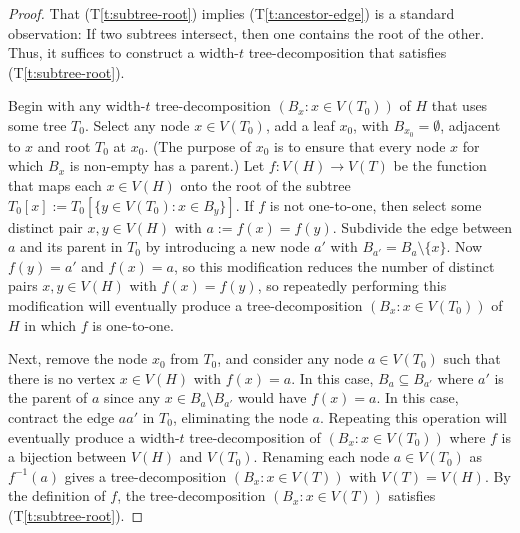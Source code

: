 \documentclass{patmorin}
\newcommand{\tref}[1]{(T\ref{t:#1})}
\begin{document}
\begin{proof}
  That \tref{subtree-root} implies \tref{ancestor-edge} is a standard observation: If two subtrees intersect, then one contains the root of the other.  Thus, it suffices to construct a width-$t$ tree-decomposition that satisfies \tref{subtree-root}.

  Begin with any width-$t$ tree-decomposition $(B_x:x\in V(T_0))$ of $H$ that uses some tree $T_0$.  Select any node $x\in V(T_0)$, add a leaf $x_0$, with $B_{x_0}=\emptyset$, adjacent to $x$ and root $T_0$ at $x_0$. (The purpose of $x_0$ is to ensure that every node $x$ for which $B_x$ is non-empty has a parent.)  Let $f:V(H)\to V(T)$ be the function that maps each $x\in V(H)$ onto the root of the subtree $T_0[x]:=T_0[\{y\in V(T_0): x\in B_y\}]$.  If $f$ is not one-to-one, then select some distinct pair $x,y\in V(H)$ with $a:=f(x)=f(y)$.  Subdivide the edge between $a$ and its parent in $T_0$ by introducing a new node $a'$ with $B_{a'}=B_{a}\setminus\{x\}$. Now $f(y)=a'$ and $f(x)=a$, so this modification reduces the number of distinct pairs $x,y\in V(H)$ with $f(x)=f(y)$, so repeatedly performing this modification will eventually produce a tree-decomposition $(B_x:x\in V(T_0))$ of $H$ in which $f$ is one-to-one.

  Next, remove the node $x_0$ from $T_0$, and consider any node $a\in V(T_0)$ such that there is no vertex $x\in V(H)$ with $f(x)=a$.  In this case, $B_{a}\subseteq B_{a'}$ where $a'$ is the parent of $a$ since any $x\in B_a\setminus B_{a'}$ would have $f(x)=a$.  In this case, contract the edge $aa'$ in $T_0$, eliminating the node $a$.  Repeating this operation will eventually produce a width-$t$ tree-decomposition of $(B_x:x\in V(T_0))$ where $f$ is a bijection between $V(H)$ and $V(T_0)$.  Renaming each node $a\in V(T_0)$ as $f^{-1}(a)$ gives a tree-decomposition $(B_x:x\in V(T))$ with $V(T)=V(H)$.  By the definition of $f$, the tree-decomposition $(B_x:x\in V(T))$ satisfies \tref{subtree-root}.
\end{proof}
\end{document}

